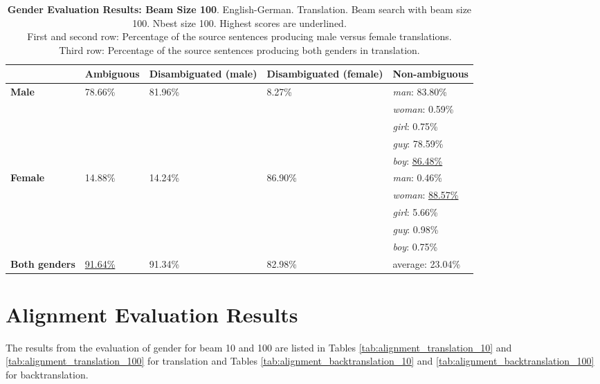 \begin{table} 
    \label{tab:gender_percent_100}
    \begin{tabularx}{\linewidth}{|X|XXXX|}
        \hline
         & \textbf{Ambiguous} & \textbf{Disambiguated (male)} & \textbf{Disambiguated (female)} & \textbf{Non-ambiguous} \\ \hline
         \textbf{Male} & 78.66\% & 81.96\% & 8.27\% & \textit{man}: 83.80\% \\
         &&&& \textit{woman}: 0.59\% \\
         &&&& \textit{girl}: 0.75\% \\
         &&&& \textit{guy}: 78.59\% \\
         &&&& \textit{boy}: \underline{86.48\%} \\ \hline
         \textbf{Female} & 14.88\% & 14.24\% & 86.90\% & \textit{man}: 0.46\% \\ 
         &&&& \textit{woman}: \underline{88.57\%} \\
         &&&& \textit{girl}: 5.66\% \\
         &&&& \textit{guy}: 0.98\% \\
         &&&& \textit{boy}: 0.75\% \\\hline
         \textbf{Both genders} & \underline{91.64\%} & 91.34\% & 82.98\% & average: 23.04\% \\ \hline
    \end{tabularx}
    \caption{\textbf{Gender Evaluation Results: Beam Size 100}. English-German. Translation. Beam search with beam size 100. Nbest size 100. Highest scores are underlined. \\ First and second row: Percentage of the source sentences producing male versus female translations. \\ Third row: Percentage of the source sentences producing both genders in translation.}
\end{table}

\section{Alignment Evaluation Results}
\label{ch:Results:Alignment}

The results from the evaluation of gender for beam 10 and 100 are listed in Tables \ref{tab:alignment_translation_10} and \ref{tab:alignment_translation_100} for translation and Tables \ref{tab:alignment_backtranslation_10} and \ref{tab:alignment_backtranslation_100} for backtranslation.

